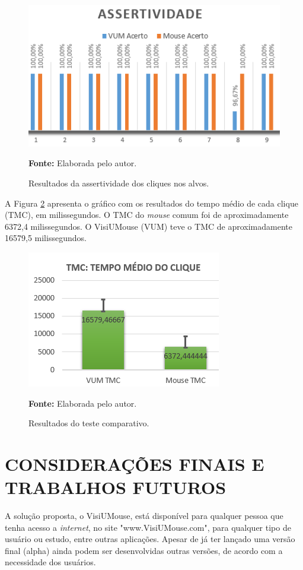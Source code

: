 \begin{figure}[htbp]
\caption{Resultados da assertividade dos cliques nos alvos.} 
\centering \includegraphics[scale=1]{img/assertividade.png}

\textbf{Fonte:} Elaborada pelo autor.
\label{fig:assertividade}
\end{figure}

A Figura \ref{fig:tmc} apresenta o gráfico com os resultados do tempo médio de cada clique (TMC), em milissegundos. O TMC do \textit{mouse} comum foi de aproximadamente 6372,4 milissegundos. O VisiUMouse (VUM) teve o TMC de aproximadamente 16579,5 milissegundos.
\begin{figure}[htbp]
\caption{Resultados do teste comparativo.} 
\centering \includegraphics[scale=1.5]{img/tmc2.png}

\textbf{Fonte:} Elaborada pelo autor.
\label{fig:tmc}
\end{figure}

\chapter{CONSIDERAÇÕES FINAIS E TRABALHOS FUTUROS}\label{CAP-consideracoes-finais-trabalhos-futuros}

A solução proposta, o VisiUMouse, está disponível para qualquer pessoa que tenha acesso a \textit{internet}, no site "www.VisiUMouse.com", para qualquer tipo de usuário ou estudo, entre outras aplicações. Apesar de já ter lançado uma versão final (alpha) ainda podem ser desenvolvidas outras versões, de acordo com a necessidade dos usuários.


